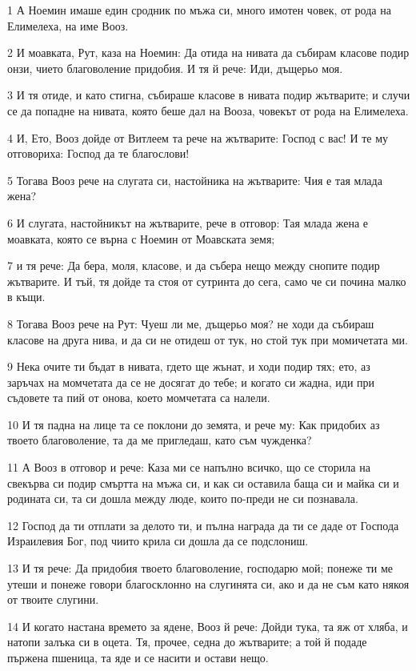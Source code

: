 \par 1 А Ноемин имаше един сродник по мъжа си, много имотен човек, от рода на Елимелеха, на име Вооз.
\par 2 И моавката, Рут, каза на Ноемин: Да отида на нивата да събирам класове подир онзи, чието благоволение придобия. И тя й рече: Иди, дъщерьо моя.
\par 3 И тя отиде, и като стигна, събираше класове в нивата подир жътварите; и случи се да попадне на нивата, която беше дал на Вооза, човекът от рода на Елимелеха.
\par 4 И, Ето, Вооз дойде от Витлеем та рече на жътварите: Господ с вас! И те му отговориха: Господ да те благослови!
\par 5 Тогава Вооз рече на слугата си, настойника на жътварите: Чия е тая млада жена?
\par 6 И слугата, настойникът на жътварите, рече в отговор: Тая млада жена е моавката, която се върна с Ноемин от Моавската земя;
\par 7 и тя рече: Да бера, моля, класове, и да събера нещо между снопите подир жътварите. И тъй, тя дойде та стоя от сутринта до сега, само че си почина малко в къщи.
\par 8 Тогава Вооз рече на Рут: Чуеш ли ме, дъщерьо моя? не ходи да събираш класове на друга нива, и да си не отидеш от тук, но стой тук при момичетата ми.
\par 9 Нека очите ти бъдат в нивата, гдето ще жънат, и ходи подир тях; ето, аз заръчах на момчетата да се не досягат до тебе; и когато си жадна, иди при съдовете та пий от онова, което момчетата са налели.
\par 10 И тя падна на лице та се поклони до земята, и рече му: Как придобих аз твоето благоволение, та да ме пригледаш, като съм чужденка?
\par 11 А Вооз в отговор и рече: Каза ми се напълно всичко, що се сторила на свекърва си подир смъртта на мъжа си, и как си оставила баща си и майка си и родината си, та си дошла между люде, които по-преди не си познавала.
\par 12 Господ да ти отплати за делото ти, и пълна награда да ти се даде от Господа Израилевия Бог, под чиито крила си дошла да се подслониш.
\par 13 И тя рече: Да придобия твоето благоволение, господарю мой; понеже ти ме утеши и понеже говори благосклонно на слугинята си, ако и да не съм като някоя от твоите слугини.
\par 14 И когато настана времето за ядене, Вооз й рече: Дойди тука, та яж от хляба, и натопи залъка си в оцета. Тя, прочее, седна до жътварите; а той й подаде пържена пшеница, та яде и се насити и остави нещо.
